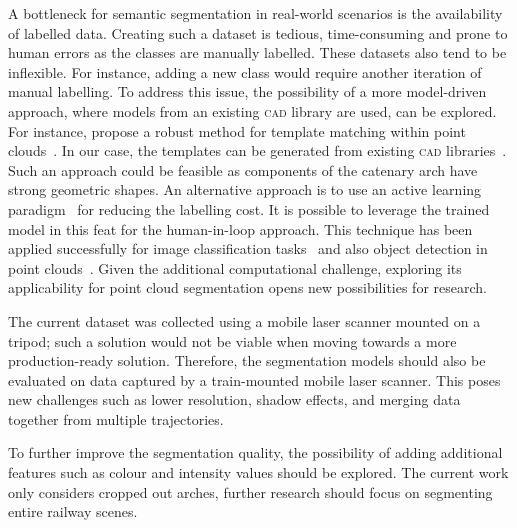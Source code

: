A bottleneck for semantic segmentation in real-world scenarios is the availability of labelled data.
Creating such a dataset is tedious, time-consuming and prone to human errors as the classes are manually labelled. These datasets also tend to be inflexible.
For instance, adding a new class would require another iteration of manual labelling. To address this issue, the possibility of a more model-driven approach, where models from an existing \textsc{cad} library are used, can be explored. For instance, \citeauthor{Vock2019} propose a robust method for template matching within point clouds~\cite{Vock2019}. In our case, the templates can be generated from existing \textsc{cad} libraries~\cite{vieth2022point}. Such an approach could be feasible as components of the catenary arch have strong geometric shapes. An alternative approach is to use an active learning paradigm~\cite{sayin2021review} for reducing the labelling cost. It is possible to leverage the trained model in this feat for the human-in-loop approach. This technique has been applied successfully for image classification tasks~\cite{budd2021survey} and also object detection in point clouds~\cite{meng2021towards}. Given the additional computational challenge, exploring its applicability for point cloud segmentation opens new possibilities for research.

The current dataset was collected using a mobile laser scanner mounted on a tripod; such a solution would not be viable when moving towards a more production-ready solution. Therefore, the segmentation models should also be evaluated on data captured by a train-mounted mobile laser scanner. This poses new challenges such as lower resolution, shadow effects, and merging data together from multiple trajectories.

To further improve the segmentation quality, the possibility of adding additional features such as colour and intensity values should be explored.
The current work only considers cropped out arches, further research should focus on segmenting entire railway scenes.
